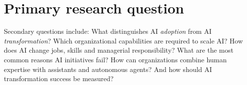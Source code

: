 \section{Primary research question}

\begin{center}
\end{center}

Secondary questions include: What distinguishes AI \textit{adoption} from AI
\textit{transformation}? Which organizational capabilities are required to
scale AI? How does AI change jobs, skills and managerial responsibility? What
are the most common reasons AI initiatives fail? How can organizations combine
human expertise with assistants and autonomous agents? And how should AI
transformation success be measured?

